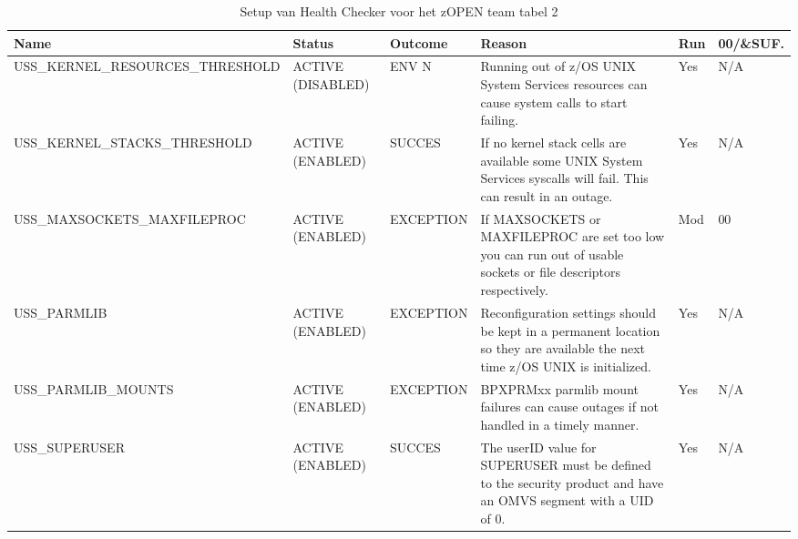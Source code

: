 \begin{landscape}
	\begin{table}[h]
		\begin{tabular}{|l|p{2.3cm}|l|p{4.5cm}|l|l|}
			\hline
			\textbf{Name}                       & \textbf{Status}   & \textbf{Outcome} & \textbf{Reason}    & \textbf{Run} &	\textbf{00/\&SUF.} \\ \hline
			USS\_KERNEL\_RESOURCES\_THRESHOLD & ACTIVE (DISABLED) & ENV N     & Running out of z/OS UNIX System Services resources can cause   system calls to start failing.                                     & Yes & N/A \\ \hline
			USS\_KERNEL\_STACKS\_THRESHOLD    & ACTIVE (ENABLED)  & SUCCES    & If no   kernel stack cells are available some UNIX System Services syscalls will    fail.   This can result in an outage.         & Yes & N/A \\ \hline
			USS\_MAXSOCKETS\_MAXFILEPROC      & ACTIVE (ENABLED)  & EXCEPTION & If   MAXSOCKETS or MAXFILEPROC are set too low you can run out of usable sockets    or file   descriptors respectively.           & Mod & 00  \\ \hline
			USS\_PARMLIB                      & ACTIVE (ENABLED)  & EXCEPTION & Reconfiguration   settings should be kept in a permanent location so they are available the   next time z/OS UNIX is initialized. & Yes & N/A \\ \hline
			USS\_PARMLIB\_MOUNTS              & ACTIVE (ENABLED)  & EXCEPTION & BPXPRMxx   parmlib mount failures can cause outages if not handled in a timely manner.                                            & Yes & N/A \\ \hline
			USS\_SUPERUSER                    & ACTIVE (ENABLED)  & SUCCES    & The   userID value for SUPERUSER must be defined to the security product and have   an OMVS   segment with a UID of 0.            & Yes & N/A \\ \hline
		\end{tabular}
		\caption[Health Checker zOpen team tabel 2]{Setup van Health Checker voor het zOPEN team tabel 2}
		\label{tbl:zOpen Team Tabel 2}
	\end{table}
\end{landscape}

